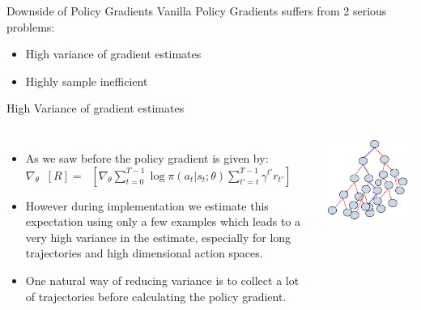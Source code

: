 \begin{frame}{Downside of Policy Gradients}
Vanilla Policy Gradients suffers from 2 serious problems:
\begin{itemize}
    \item High variance of gradient estimates
    \item Highly sample inefficient
\end{itemize}
\end{frame}

\begin{frame}{High Variance of gradient estimates}
    \begin{columns}
        \begin{itemize}
            \item As we saw before the policy gradient is given by: $\nabla_\theta \mathop{\mathbb{E}_\tau}[R] = \mathop{\mathbb{E}_\tau}[ \nabla_\theta \sum_{t=0}^{T-1}\log\pi(a_t|s_t;\theta)\sum_{t' = t}^{T-1} \gamma^{t'} r_{t'}]$
            \item However during implementation we estimate this expectation using only a few examples which leads to a very high variance in the estimate, especially for long trajectories and high dimensional action spaces.
            \item One natural way of reducing variance is to collect a lot of trajectories before calculating the policy gradient.
        \end{itemize}
        \includegraphics[scale = 0.3]{img/highvar.png}
    \end{columns}
\end{frame}
